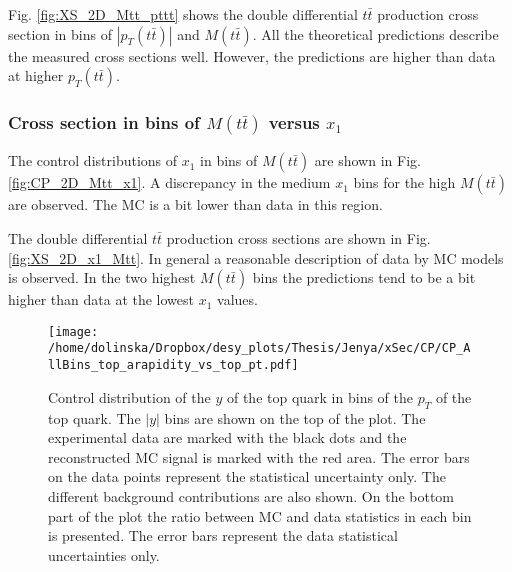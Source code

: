 Fig. \ref{fig:XS_2D_Mtt_pttt} shows the double differential $t\bar{t}$ production cross section in bins of $|p_{T}(t\bar{t})|$ and $M(t\bar{t})$.
All the theoretical predictions describe the measured cross sections well. However, the predictions are higher than data at higher $p_{T}(t\bar{t})$.

% 
% 

\subsubsection{Cross section in bins of $M(t\bar{t})$ versus $x_{1}$}

The control distributions of $x_{1}$ in bins of $M(t\bar{t})$ are shown in Fig. \ref{fig:CP_2D_Mtt_x1}. A discrepancy in the medium $x_{1}$ bins for the 
high $M(t\bar{t})$ are observed. The MC is a bit lower than data in this region.

The double differential $t\bar{t}$ production cross sections are shown in Fig. \ref{fig:XS_2D_x1_Mtt}. In general a reasonable description of data by MC
models is observed. In the two highest $M(t\bar{t})$ bins the predictions tend to be a bit higher than data at the lowest $x_{1}$ values.




\begin{figure}[H]
  \centering
  \texttt{[image: /home/dolinska/Dropbox/desy\_plots/Thesis/Jenya/xSec/CP/CP\_AllBins\_top\_arapidity\_vs\_top\_pt.pdf]}
  \caption{Control distribution of the $y$ of the top quark in bins of the $p_{T}$ of the top quark. The $|y|$ bins are shown on the top 
  of the plot. The experimental data are marked with the black dots and the reconstructed MC signal is marked with the red area. The error
  bars on the data points represent the statistical uncertainty only. The 
  different background contributions are also shown. On the bottom part of the plot the ratio between MC and data statistics in each bin
  is presented. The error bars represent the data statistical uncertainties only.}
  \label{fig:CP_2D_y_pt}
\end{figure}

